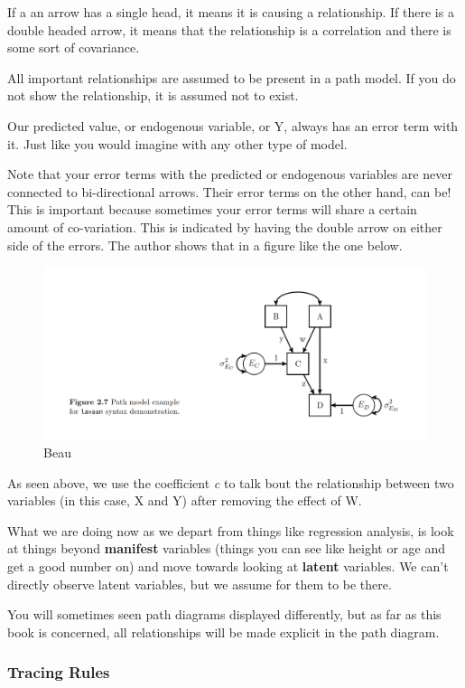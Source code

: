 \documentclass[]{book}
\theoremstyle{definition}
\theoremstyle{definition}
\theoremstyle{definition}
\theoremstyle{remark}
\begin{document}
If a an arrow has a single head, it means it is causing a relationship.
If there is a double headed arrow, it means that the relationship is a
correlation and there is some sort of covariance.

All important relationships are assumed to be present in a path model.
If you do not show the relationship, it is assumed not to exist.

Our predicted value, or endogenous variable, or Y, always has an error
term with it. Just like you would imagine with any other type of model.

Note that your error terms with the predicted or endogenous variables
are never connected to bi-directional arrows. Their error terms on the
other hand, can be! This is important because sometimes your error terms
will share a certain amount of co-variation. This is indicated by having
the double arrow on either side of the errors. The author shows that in
a figure like the one below.

\begin{figure}
\centering
\includegraphics{img/beaupath3.png}
\caption{Beau}
\end{figure}

As seen above, we use the coefficient \emph{c} to talk bout the
relationship between two variables (in this case, X and Y) after
removing the effect of W.

What we are doing now as we depart from things like regression analysis,
is look at things beyond \textbf{manifest} variables (things you can see
like height or age and get a good number on) and move towards looking at
\textbf{latent} variables. We can't directly observe latent variables,
but we assume for them to be there.

You will sometimes seen path diagrams displayed differently, but as far
as this book is concerned, all relationships will be made explicit in
the path diagram.

\subsubsection{Tracing Rules}\label{tracing-rules}
\end{document}
